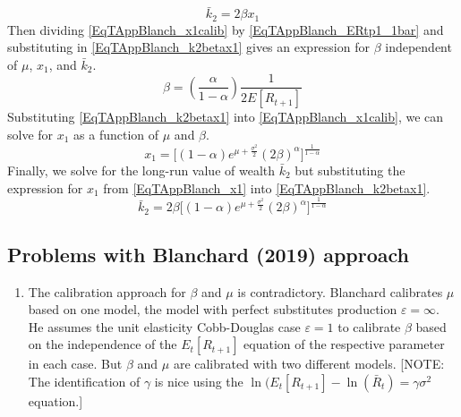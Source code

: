\documentclass[letterpaper,12pt]{article}
\theoremstyle{definition}
\newcommand\ve{\varepsilon}
\begin{document}
    \begin{equation}\label{EqTAppBlanch_k2betax1}
      \bar{k}_2 = 2\beta x_1
    \end{equation}
    Then dividing \eqref{EqTAppBlanch_x1calib} by \eqref{EqTAppBlanch_ERtp1_1bar} and substituting in \eqref{EqTAppBlanch_k2betax1} gives an expression for $\beta$ independent of $\mu$, $x_1$, and $\bar{k}_2$.
    \begin{equation}\label{EqTAppBlanch_beta}
      \beta = \left(\frac{\alpha}{1-\alpha}\right)\frac{1}{2 E[R_{t+1}]}
    \end{equation}
    Substituting \eqref{EqTAppBlanch_k2betax1} into \eqref{EqTAppBlanch_x1calib}, we can solve for $x_1$ as a function of $\mu$ and $\beta$.
    \begin{equation}\label{EqTAppBlanch_x1}
      x_1 = \Big[(1-\alpha)e^{\mu + \frac{\sigma^2}{2}}(2\beta)^\alpha\Bigr]^\frac{1}{1-\alpha}
    \end{equation}
    Finally, we solve for the long-run value of wealth $\bar{k}_2$ but substituting the expression for $x_1$ from \eqref{EqTAppBlanch_x1} into \eqref{EqTAppBlanch_k2betax1}.
    \begin{equation}\label{EqTAppBlanch_k2barfinal}
      \bar{k}_2 = 2\beta\Big[(1-\alpha)e^{\mu + \frac{\sigma^2}{2}}(2\beta)^\alpha\Bigr]^\frac{1}{1-\alpha}
    \end{equation}








  \subsection{Problems with Blanchard (2019) approach}\label{SecTAppBlanch_Probs}

    \begin{enumerate}
      \item The calibration approach for $\beta$ and $\mu$ is contradictory. Blanchard calibrates $\mu$ based on one model, the model with perfect substitutes production $\ve=\infty$. He assumes the unit elasticity Cobb-Douglas case $\ve=1$ to calibrate $\beta$ based on the independence of the $E_t[R_{t+1}]$ equation of the respective parameter in each case. But $\beta$ and $\mu$ are calibrated with two different models. [NOTE: The identification of $\gamma$ is nice using the $\ln(E_t[R_{t+1}]-\ln(\bar{R}_t)=\gamma\sigma^2$ equation.]
    \end{enumerate}
\end{document}

